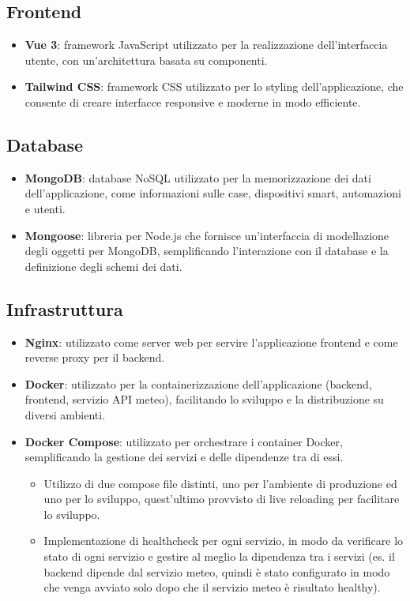 \documentclass[a4paper,12pt]{article}
\begin{document}
\subsection{Frontend}
\begin{itemize}
    \item \textbf{Vue 3}: framework JavaScript utilizzato per la realizzazione dell'interfaccia utente, con un'architettura basata su componenti.
    \item \textbf{Tailwind CSS}: framework CSS utilizzato per lo styling dell'applicazione, che consente di creare interfacce responsive e moderne in modo efficiente.
\end{itemize}

\subsection{Database}
\begin{itemize}
    \item \textbf{MongoDB}: database NoSQL utilizzato per la memorizzazione dei dati dell'applicazione, come informazioni sulle case, dispositivi smart, automazioni e utenti.
    \item \textbf{Mongoose}: libreria per Node.js che fornisce un'interfaccia di modellazione degli oggetti per MongoDB, semplificando l'interazione con il database e la definizione degli schemi dei dati.
\end{itemize}

\subsection{Infrastruttura}
\begin{itemize}
    \item \textbf{Nginx}: utilizzato come server web per servire l'applicazione frontend e come reverse proxy per il backend.
    \item \textbf{Docker}: utilizzato per la containerizzazione dell'applicazione (backend, frontend, servizio API meteo), facilitando lo sviluppo e la distribuzione su diversi ambienti.
    \item \textbf{Docker Compose}: utilizzato per orchestrare i container Docker, semplificando la gestione dei servizi e delle dipendenze tra di essi.
    \begin{itemize}
        \item Utilizzo di due compose file distinti, uno per l'ambiente di produzione ed uno per lo sviluppo, quest'ultimo provvisto di live reloading per facilitare lo sviluppo.
        \item Implementazione di healthcheck per ogni servizio, in modo da verificare lo stato di ogni servizio e gestire al meglio la dipendenza tra i servizi (es. il backend dipende dal servizio meteo, quindi è stato configurato in modo che venga avviato solo dopo che il servizio meteo è risultato healthy).
    \end{itemize}
\end{itemize}
\end{document}
